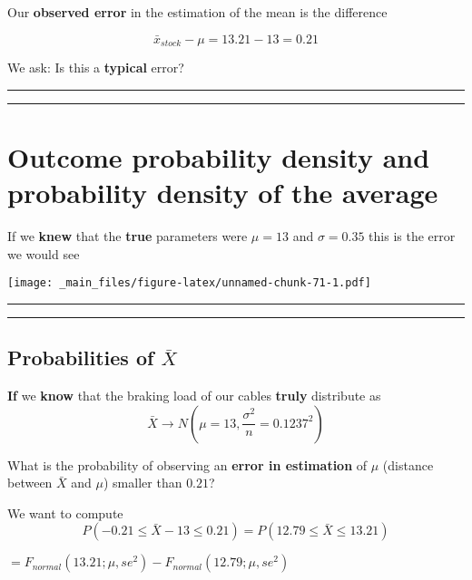 \documentclass[
]{book}
\begin{document}
Our \textbf{observed error} in the estimation of the mean is the difference

\[\bar{x}_{stock}-\mu=13.21-13=0.21\]

We ask: Is this a \textbf{typical} error?

\begin{center}\rule{0.5\linewidth}{0.5pt}\end{center}

\begin{center}\rule{0.5\linewidth}{0.5pt}\end{center}

\hypertarget{outcome-probability-density-and-probability-density-of-the-average-1}{%
\section{Outcome probability density and probability density of the average}\label{outcome-probability-density-and-probability-density-of-the-average-1}}

If we \textbf{knew} that the \textbf{true} parameters were \(\mu=13\) and \(\sigma=0.35\) this is the error we would see

\texttt{[image: \_main\_files/figure-latex/unnamed-chunk-71-1.pdf]}

\begin{center}\rule{0.5\linewidth}{0.5pt}\end{center}

\begin{center}\rule{0.5\linewidth}{0.5pt}\end{center}

\hypertarget{probabilities-of-barx}{%
\subsection{\texorpdfstring{Probabilities of \(\bar{X}\)}{Probabilities of \textbackslash bar\{X\}}}\label{probabilities-of-barx}}

\textbf{If} we \textbf{know} that the braking load of our cables \textbf{truly} distribute as \[\bar{X} \rightarrow N(\mu=13, \frac{\sigma^2}{n}=0.1237^2)\]

What is the probability of observing an \textbf{error in estimation} of \(\mu\) (distance between \(\bar{X}\) and \(\mu\)) smaller than \(0.21\)?

We want to compute \[P(-0.21 \leq \bar{X} - 13\leq 0.21)=P(12.79 \leq \bar{X} \leq 13.21)\]

\(=F_{normal}(13.21; \mu, se^2)-F_{normal}(12.79; \mu, se^2)\)
\end{document}
